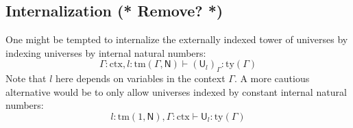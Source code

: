\documentclass[11pt,a4paper]{article}
\theoremstyle{definition}
\newcommand{\UU}{\mathsf{U}}
\def\UU{\mathsf{U}}
\newcommand{\N}{\mathsf{N}}
\newcommand{\ctx}{\mathrm{ctx}}
\newcommand{\ty}{\mathrm{ty}}
\newcommand{\tm}{\mathrm{tm}}
\def\U{\mathsf{U}}
\newcommand{\Ta}{\mathrm{T}}
\begin{document}
%
%

\subsection{Internalization (* Remove? *)}
One might be tempted to internalize the externally indexed tower of universes by indexing universes by internal natural numbers: 
$$\Gamma : \ctx, l : \tm(\Gamma,\N) \vdash (\UU_l)_\Gamma : \ty(\Gamma)$$
Note that $l$ here depends on variables in the context $\Gamma$. 
A more cautious alternative would be to only
allow universes indexed by constant internal natural numbers:
$$ l : \tm(1,\N), \Gamma : \ctx \vdash \UU_l : \ty(\Gamma)$$
\end{document}
